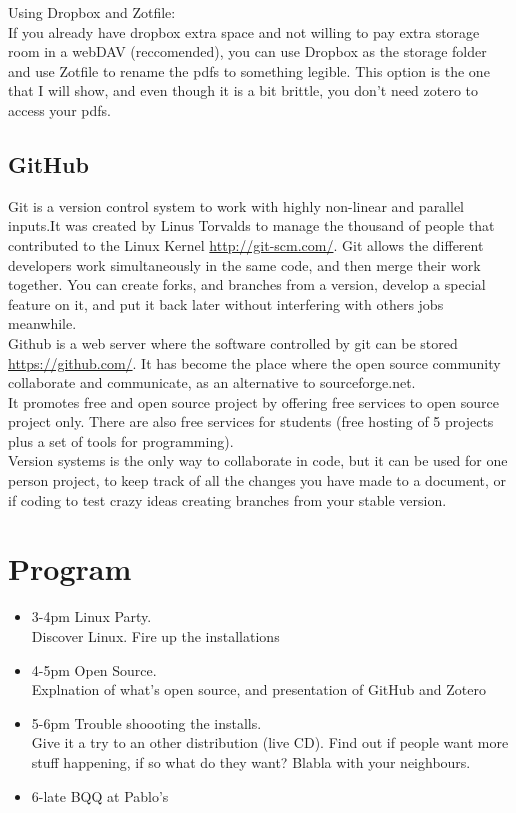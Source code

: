 \documentclass[a4paper]{article}
\begin{document}
Using Dropbox and Zotfile:\\
If you already have dropbox extra space and not willing to pay extra storage room in a webDAV (reccomended), you can use Dropbox as the storage folder and use Zotfile to rename the pdfs to something legible. This option is the one that I will show, and even though it is a bit brittle, you don't need zotero to access your pdfs.

\subsection{GitHub}
Git is a version control system to work with highly non-linear and parallel inputs.It was created by Linus Torvalds to manage the thousand of people that contributed to the Linux Kernel \url{http://git-scm.com/}. Git allows the different developers work simultaneously in the same code, and then merge their work together. You can create forks, and branches from a version, develop a special feature on it, and put it back later without interfering with others jobs meanwhile.\\

Github is a web server where the software controlled by git can be stored \url{https://github.com/}. It has become the place where the open source community collaborate and communicate, as an alternative to sourceforge.net.\\
It promotes free and open source project by offering free services to open source project only. There are also free services for students (free hosting of 5 projects plus a set of tools for programming).\\
Version systems is the only way to collaborate in code, but it can be used for one person project, to keep track of all the changes you have made to a document, or if coding to test crazy ideas creating branches from your stable version.\\

\section{Program}
\begin{itemize}
\item 3-4pm Linux Party.\\
Discover Linux. Fire up the installations
\item 4-5pm Open Source.\\
Explnation of what's open source, and presentation of GitHub and Zotero
\item 5-6pm Trouble shoooting the installs.\\
Give it a try to an other distribution (live CD). Find out if people want more stuff happening, if so what do they want? Blabla with your neighbours.
\item 6-late BQQ at Pablo's
\end{itemize}
\end{document}
